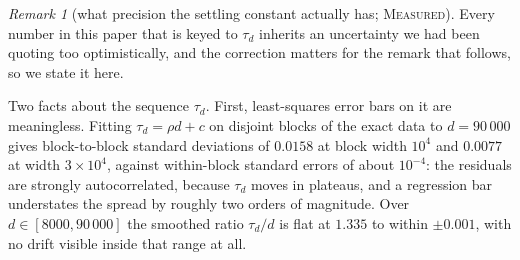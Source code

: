 \documentclass[11pt]{article}
\theoremstyle{definition}
\theoremstyle{remark}
\newtheorem{remark}[theorem]{Remark}
\newcommand{\MEASURED}{\textsc{Measured}}
\begin{document}
\begin{remark}[what precision the settling constant actually has; \MEASURED]\label{fr:slopebar}
Every number in this paper that is keyed to $\tau_d$ inherits an uncertainty we had been quoting too
optimistically, and the correction matters for the remark that follows, so we state it here.

Two facts about the sequence $\tau_d$. First, least-squares error bars on it are meaningless. Fitting
$\tau_d=\rho d+c$ on disjoint blocks of the exact data to $d=90\,000$ gives block-to-block standard
deviations of $0.0158$ at block width $10^{4}$ and $0.0077$ at width $3\times10^{4}$, against
within-block standard errors of about $10^{-4}$: the residuals are strongly autocorrelated, because
$\tau_d$ moves in plateaus, and a regression bar understates the spread by roughly two orders of
magnitude. Over $d\in[8000,90\,000]$ the smoothed ratio $\tau_d/d$ is flat at $1.335$ to within
$\pm0.001$, with no drift visible inside that range at all.


\end{remark}
\end{document}
